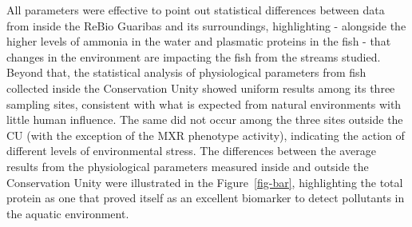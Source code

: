 \documentclass[
  american,
  letterpaper,
  DIV=11,
  numbers=noendperiod]{scrartcl}
\newenvironment{Shaded}{}{}
\newcommand{\AttributeTok}[1]{\textcolor[rgb]{0.49,0.56,0.16}{#1}}
\newcommand{\DecValTok}[1]{\textcolor[rgb]{0.25,0.63,0.44}{#1}}
\newcommand{\FunctionTok}[1]{\textcolor[rgb]{0.02,0.16,0.49}{#1}}
\newcommand{\NormalTok}[1]{#1}
\newcommand{\OtherTok}[1]{\textcolor[rgb]{0.00,0.44,0.13}{#1}}
\newcommand{\SpecialCharTok}[1]{\textcolor[rgb]{0.25,0.44,0.63}{#1}}
\newcommand{\StringTok}[1]{\textcolor[rgb]{0.25,0.44,0.63}{#1}}
\begin{document}
All parameters were effective to point out statistical differences
between data from inside the ReBio Guaribas and its surroundings,
highlighting - alongside the higher levels of ammonia in the water and
plasmatic proteins in the fish - that changes in the environment are
impacting the fish from the streams studied. Beyond that, the
statistical analysis of physiological parameters from fish collected
inside the Conservation Unity showed uniform results among its three
sampling sites, consistent with what is expected from natural
environments with little human influence. The same did not occur among
the three sites outside the CU (with the exception of the MXR phenotype
activity), indicating the action of different levels of environmental
stress. The differences between the average results from the
physiological parameters measured inside and outside the Conservation
Unity were illustrated in the Figure~\ref{fig-bar}, highlighting the
total protein as one that proved itself as an excellent biomarker to
detect pollutants in the aquatic environment.

\begin{Shaded}
\end{Shaded}
\end{document}
